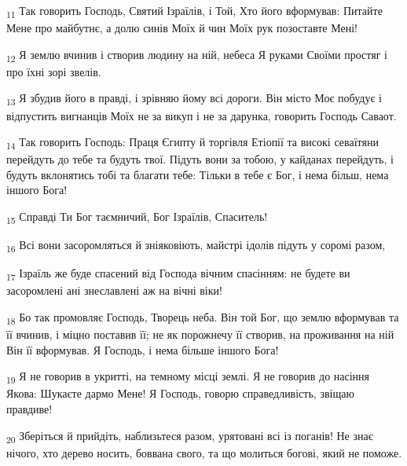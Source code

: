 \begin{tcolorbox}
\textsubscript{11} Так говорить Господь, Святий Ізраїлів, і Той, Хто його вформував: Питайте Мене про майбутнє, а долю синів Моїх й чин Моїх рук позоставте Мені!
\end{tcolorbox}
\begin{tcolorbox}
\textsubscript{12} Я землю вчинив і створив людину на ній, небеса Я руками Своїми простяг і про їхні зорі звелів.
\end{tcolorbox}
\begin{tcolorbox}
\textsubscript{13} Я збудив його в правді, і зрівняю йому всі дороги. Він місто Моє побудує і відпустить вигнанців Моїх не за викуп і не за дарунка, говорить Господь Саваот.
\end{tcolorbox}
\begin{tcolorbox}
\textsubscript{14} Так говорить Господь: Праця Єгипту й торгівля Етіопії та високі севаїтяни перейдуть до тебе та будуть твої. Підуть вони за тобою, у кайданах перейдуть, і будуть вклонятись тобі та благати тебе: Тільки в тебе є Бог, і нема більш, нема іншого Бога!
\end{tcolorbox}
\begin{tcolorbox}
\textsubscript{15} Справді Ти Бог таємничий, Бог Ізраїлів, Спаситель!
\end{tcolorbox}
\begin{tcolorbox}
\textsubscript{16} Всі вони засоромляться й зніяковіють, майстрі ідолів підуть у соромі разом,
\end{tcolorbox}
\begin{tcolorbox}
\textsubscript{17} Ізраїль же буде спасений від Господа вічним спасінням: не будете ви засоромлені ані знеславлені аж на вічні віки!
\end{tcolorbox}
\begin{tcolorbox}
\textsubscript{18} Бо так промовляє Господь, Творець неба. Він той Бог, що землю вформував та її вчинив, і міцно поставив її; не як порожнечу її створив, на проживання на ній Він її вформував. Я Господь, і нема більше іншого Бога!
\end{tcolorbox}
\begin{tcolorbox}
\textsubscript{19} Я не говорив в укритті, на темному місці землі. Я не говорив до насіння Якова: Шукаєте дармо Мене! Я Господь, говорю справедливість, звіщаю правдиве!
\end{tcolorbox}
\begin{tcolorbox}
\textsubscript{20} Зберіться й прийдіть, наблизьтеся разом, урятовані всі із поганів! Не знає нічого, хто дерево носить, боввана свого, та що молиться богові, який не поможе.
\end{tcolorbox}
